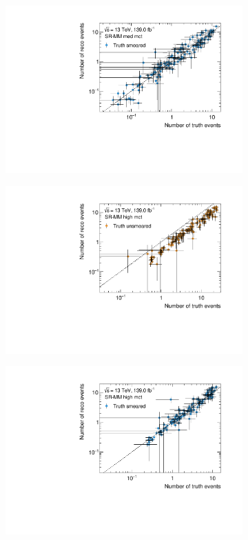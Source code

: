 \begin{figure}
\begin{subfigure}[b]{0.49\linewidth}
	\end{subfigure}\hfill
	\begin{subfigure}[b]{0.49\linewidth}
		\centering\includegraphics[width=\textwidth]{yields_SR-MM_med_mct_smeared}
	\end{subfigure}\hfill
	\begin{subfigure}[b]{0.49\linewidth}
		\centering\includegraphics[width=\textwidth]{yields_SR-MM_high_mct_unsmeared}
	\end{subfigure}\hfill
	\begin{subfigure}[b]{0.49\linewidth}
		\centering\includegraphics[width=\textwidth]{yields_SR-MM_high_mct_smeared}

\end{subfigure}
\end{figure}
